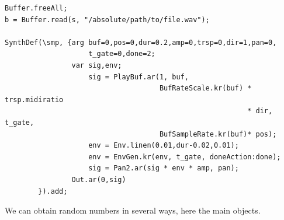 \begin{lstlisting}[frame=single] 
Buffer.freeAll;
b = Buffer.read(s, "/absolute/path/to/file.wav");

SynthDef(\smp, {arg buf=0,pos=0,dur=0.2,amp=0,trsp=0,dir=1,pan=0,
                    t_gate=0,done=2;
                var sig,env;
                    sig = PlayBuf.ar(1, buf,          
                                     BufRateScale.kr(buf) * trsp.midiratio  
                                                          * dir, t_gate,
                                     BufSampleRate.kr(buf)* pos);                  
                    env = Env.linen(0.01,dur-0.02,0.01);                   
                    env = EnvGen.kr(env, t_gate, doneAction:done);
                    sig = Pan2.ar(sig * env * amp, pan);
                Out.ar(0,sig)
        }).add;
\end{lstlisting}

We can obtain random numbers in several ways, here the main objects.

